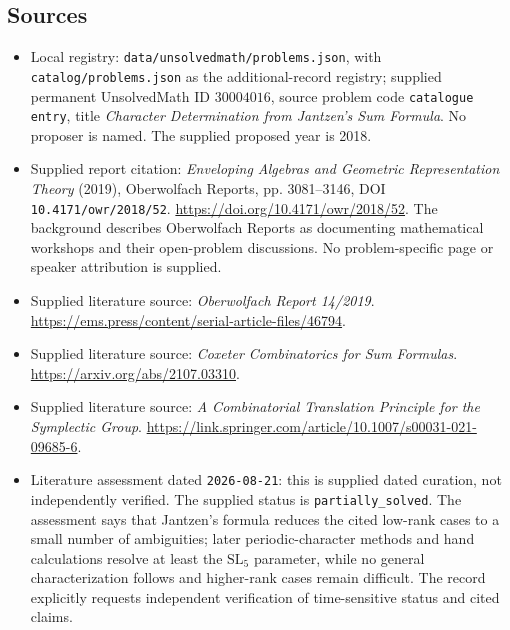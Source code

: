 \documentclass[11pt]{article}
\begin{document}
\subsection{Sources}
\begin{itemize}
\item Local registry: \texttt{data/unsolvedmath/problems.json}, with \texttt{catalog/problems.json} as the additional-record registry; supplied permanent UnsolvedMath ID \(30004016\), source problem code \texttt{catalogue entry}, title \emph{Character Determination from Jantzen's Sum Formula}. No proposer is named. The supplied proposed year is 2018.
\item Supplied report citation: \emph{Enveloping Algebras and Geometric Representation Theory} (2019), Oberwolfach Reports, pp. 3081--3146, DOI \texttt{10.4171/owr/2018/52}. \url{https://doi.org/10.4171/owr/2018/52}. The background describes Oberwolfach Reports as documenting mathematical workshops and their open-problem discussions. No problem-specific page or speaker attribution is supplied.
\item Supplied literature source: \emph{Oberwolfach Report 14/2019}. \url{https://ems.press/content/serial-article-files/46794}.
\item Supplied literature source: \emph{Coxeter Combinatorics for Sum Formulas}. \url{https://arxiv.org/abs/2107.03310}.
\item Supplied literature source: \emph{A Combinatorial Translation Principle for the Symplectic Group}. \url{https://link.springer.com/article/10.1007/s00031-021-09685-6}.
\item Literature assessment dated \texttt{2026-08-21}: this is supplied dated curation, not independently verified. The supplied status is \texttt{partially\_solved}. The assessment says that Jantzen's formula reduces the cited low-rank cases to a small number of ambiguities; later periodic-character methods and hand calculations resolve at least the \(\mathrm{SL}_5\) parameter, while no general characterization follows and higher-rank cases remain difficult. The record explicitly requests independent verification of time-sensitive status and cited claims.
\end{itemize}
\end{document}
